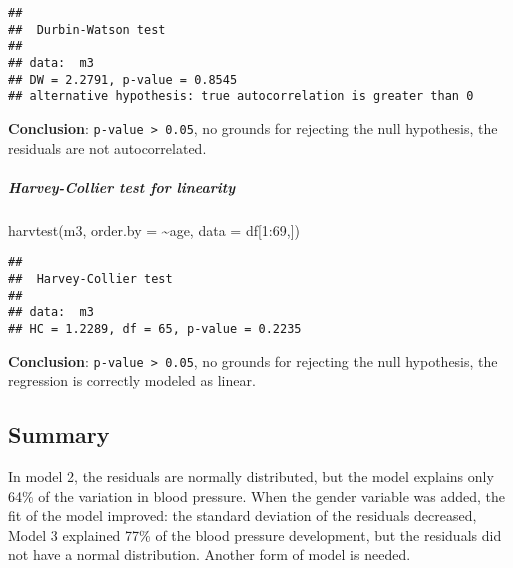 \documentclass[
]{article}
\newenvironment{Shaded}{\begin{snugshade}}{\end{snugshade}}
\newcommand{\AttributeTok}[1]{\textcolor[rgb]{0.77,0.63,0.00}{#1}}
\newcommand{\DecValTok}[1]{\textcolor[rgb]{0.00,0.00,0.81}{#1}}
\newcommand{\FunctionTok}[1]{\textcolor[rgb]{0.00,0.00,0.00}{#1}}
\newcommand{\NormalTok}[1]{#1}
\newcommand{\SpecialCharTok}[1]{\textcolor[rgb]{0.00,0.00,0.00}{#1}}
\begin{document}
\begin{verbatim}
## 
##  Durbin-Watson test
## 
## data:  m3
## DW = 2.2791, p-value = 0.8545
## alternative hypothesis: true autocorrelation is greater than 0
\end{verbatim}

\textbf{Conclusion}: \texttt{p-value\ \textgreater{}\ 0.05}, no grounds
for rejecting the null hypothesis, the residuals are not autocorrelated.

\hypertarget{harvey-collier-test-for-linearity-2}{%
\subparagraph{Harvey-Collier test for
linearity}\label{harvey-collier-test-for-linearity-2}}

\begin{Shaded}
\begin{Highlighting}[]
\FunctionTok{harvtest}\NormalTok{(m3, }\AttributeTok{order.by =} \SpecialCharTok{\textasciitilde{}}\NormalTok{age, }\AttributeTok{data =}\NormalTok{ df[}\DecValTok{1}\SpecialCharTok{:}\DecValTok{69}\NormalTok{,])}
\end{Highlighting}
\end{Shaded}

\begin{verbatim}
## 
##  Harvey-Collier test
## 
## data:  m3
## HC = 1.2289, df = 65, p-value = 0.2235
\end{verbatim}

\textbf{Conclusion}: \texttt{p-value\ \textgreater{}\ 0.05}, no grounds
for rejecting the null hypothesis, the regression is correctly modeled
as linear.

\hypertarget{summary}{%
\subsection{Summary}\label{summary}}

In model 2, the residuals are normally distributed, but the model
explains only 64\% of the variation in blood pressure. When the gender
variable was added, the fit of the model improved: the standard
deviation of the residuals decreased, Model 3 explained 77\% of the
blood pressure development, but the residuals did not have a normal
distribution. Another form of model is needed.
\end{document}
